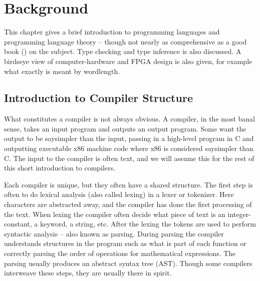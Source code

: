 \chapter{Background}
\label{chaBackground}
This chapter gives a brief introduction to programming languages and programming language theory -- though not nearly as comprehensive as a good book (\cite{src:DragonBook, src:CraftingInterp}) on the subject. Type checking and type inference is also discussed. A birdseye view of computer-hardware and FPGA design is also given, for example what exactly is meant by wordlength.

% 

\section{Introduction to Compiler Structure}
What constitutes a compiler is not always obvious. A compiler, in the most banal sense, takes an input program and outputs an output program. Some want the output to be say{simpler} than the input, passing in a high-level program in C and outputting executable x86 machine code where x86 is considered say{simpler} than C. The input to the compiler is often text, and we will assume this for the rest of this short introduction to compilers.

Each compiler is unique, but they often have a shared structure. The first step is often to do lexical analysis (also called lexing) in a lexer or tokenizer. Here characters are abstracted away, and the compiler has done the first processing of the text. When lexing the compiler often decide what piece of text is an integer-constant, a keyword, a string, etc. After the lexing the tokens are used to perform syntactic analysis -- also known as parsing. During parsing the compiler understands structures in the program such as what is part of each function or correctly parsing the order of operations for mathematical expressions. The parsing usually produces an abstract syntax tree (AST). Though some compilers interweave these steps, they are usually there in spirit.

